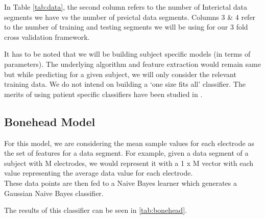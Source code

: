 \documentclass[a4paper]{article}
\begin{document}
In Table \ref{tab:data}, the second column refers to the number of Interictal data segments we have vs the number of preictal data segments. Columns 3 \& 4 refer to the number of training and testing segments we will be using for our 3 fold cross validation framework.

It has to be noted that we will be building subject specific models (in terms of parameters). The underlying algorithm and feature extraction would remain same but while predicting for a given subject, we will only consider the relevant training data. We do not intend on building a `one size fits all' classifier. The merits of using patient specific classifiers have been studied in \cite{yunpark}.

\subsection{Bonehead Model}
For this model, we are considering the mean sample values for each electrode as the set of features for a data segment. For example, given a data segment of a subject with M electrodes, we would represent it with a 1 x M vector with each value representing the average data value for each electrode. \\
These data points are then fed to a Naive Bayes learner which generates a Gaussian Naive Bayes classifier.

The results of this classifier can be seen in \ref{tab:bonehead}.


\begin{table}[!htbp]
\centering
{}
\caption{Performance of the bonehead model.}
\label{tab:bonehead}
\end{table}
\end{document}
